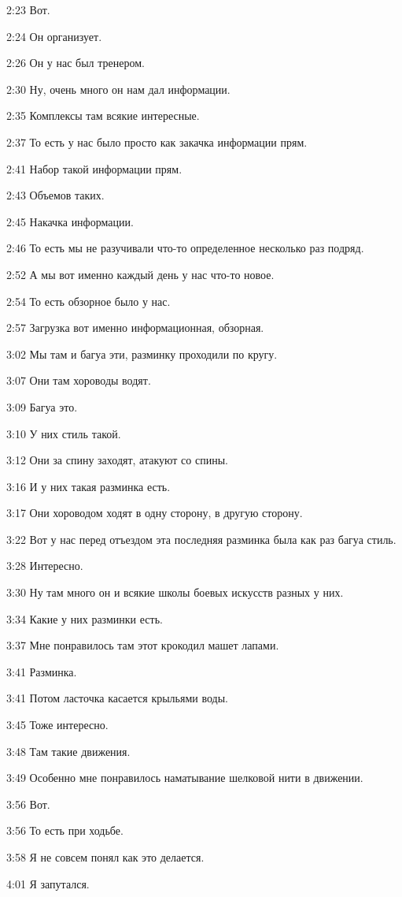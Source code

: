 2:23
Вот.

2:24
Он организует.

2:26
Он у нас был тренером.

2:30
Ну, очень много он нам дал информации.

2:35
Комплексы там всякие интересные.

2:37
То есть у нас было просто как закачка информации прям.

2:41
Набор такой информации прям.

2:43
Объемов таких.

2:45
Накачка информации.

2:46
То есть мы не разучивали что-то определенное несколько раз подряд.

2:52
А мы вот именно каждый день у нас что-то новое.

2:54
То есть обзорное было у нас.

2:57
Загрузка вот именно информационная, обзорная.

3:02
Мы там и багуа эти, разминку проходили по кругу.

3:07
Они там хороводы водят.

3:09
Багуа это.

3:10
У них стиль такой.

3:12
Они за спину заходят, атакуют со спины.

3:16
И у них такая разминка есть.

3:17
Они хороводом ходят в одну сторону, в другую сторону.

3:22
Вот у нас перед отъездом эта последняя разминка была как раз багуа стиль.

3:28
Интересно.

3:30
Ну там много он и всякие школы боевых искусств разных у них.

3:34
Какие у них разминки есть.

3:37
Мне понравилось там этот крокодил машет лапами.

3:41
Разминка.

3:41
Потом ласточка касается крыльями воды.

3:45
Тоже интересно.

3:48
Там такие движения.

3:49
Особенно мне понравилось наматывание шелковой нити в движении.

3:56
Вот.

3:56
То есть при ходьбе.

3:58
Я не совсем понял как это делается.

4:01
Я запутался.

